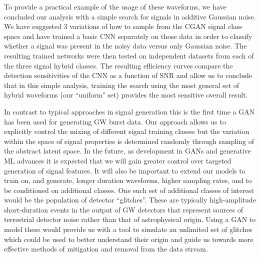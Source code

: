 \documentclass[12pt]{iopart}
\begin{document}
%
To provide a practical example of the usage of these waveforms, we have concluded our analysis with a simple search for signals in additive Gaussian noise. We have suggested 3 variations of how to sample from the \ac{CGAN} signal class space and have trained a basic \ac{CNN} separately on those data in order to classify whether a signal was present in the noisy data versus only Gaussian noise. The resulting trained networks were then tested on independent datasets from each of the three signal hybrid classes. The resulting efficiency curves compare the detection sensitivities of the \ac{CNN} as a function of \ac{SNR} and allow us to conclude that in this simple analysis, training the search using the most general set of hybrid waveforms (our ``uniform" set) provides the most sensitive overall result. 

%
In contrast to typical approaches in signal generation this is the first time a \ac{GAN} has been used for generating GW burst data. Our approach allows us to explicitly control the mixing of different signal training classes but the variation within the space of signal properties is determined randomly through sampling of the abstract latent space. In the future, as development in \acp{GAN} and generative \ac{ML} advances it is expected that we will gain greater control over targeted generation of signal features. It will also be important to extend our models to train on, and generate, longer duration waveforms, higher sampling rates, and to be conditioned on additional classes. One such set of additional classes of interest would be the population of detector ``glitches''. These are typically high-amplitude short-duration events in the output of GW detectors that represent sources of terrestrial detector noise rather than that of astrophysical origin. Using a \ac{GAN} to model these would provide us with a tool to simulate an unlimited set of glitches which could be used to better understand their origin and guide us towards more effective methods of mitigation and removal from the data stream. 

% 
\end{document}
